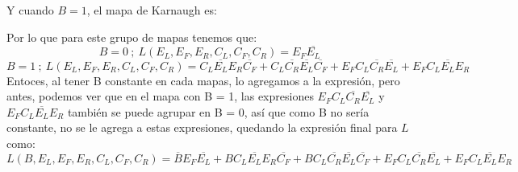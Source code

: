 \documentclass[a4paper]{article}
\begin{document}
Y cuando $B = 1$, el mapa de Karnaugh es:

\vspace{1cm}

Por lo que para este grupo de mapas tenemos que:
\begin{equation}
    B = 0\ ;\  L(E_L,E_F,E_R,C_L,C_F,C_R) = E_F \overline{E_L}
\end{equation}
\begin{equation}
    B = 1\ ;\  L(E_L,E_F,E_R,C_L,C_F,C_R) =  C_L \overline{E_L} E_R \overline{C_F} + C_L \overline{C_R} \overline{E_L} \overline{C_F} + E_F C_L \overline{C_R} \overline{E_L} + E_F C_L \overline{E_L} E_R
\end{equation}
Entoces, al tener B constante en cada mapas, lo agregamos a la expresión, pero antes, podemos ver que en el mapa con B = 1, las expresiones $E_F C_L \overline{C_R} \overline{E_L}$ y $E_F C_L \overline{E_L} E_R$ también se puede agrupar en B = 0, así que como B no sería constante, no se le agrega a estas expresiones, quedando la expresión final para $L$ como:
\begin{equation}
    L(B,E_L,E_F,E_R,C_L,C_F,C_R) = \overline{B} E_F \overline{E_L} + B C_L \overline{E_L} E_R \overline{C_F} + B C_L \overline{C_R} \overline{E_L} \overline{C_F} + E_F C_L \overline{C_R} \overline{E_L} + E_F C_L \overline{E_L} E_R
\end{equation}
\end{document}
